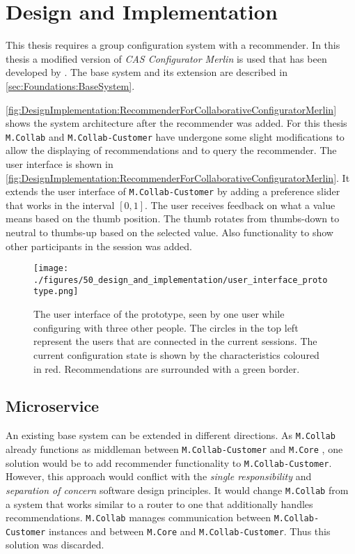 \chapter{Design and Implementation}
\label{ch:DesignImplementation}

This thesis requires a group configuration system with a recommender. In this thesis a modified version of \emph{CAS Configurator Merlin} \cite{IndustrySpecificProduct2020} is used that has been developed by \citeauthor{raabKollaborativeProduktkonfigurationEchtzeit2019} \cite{raabKollaborativeProduktkonfigurationEchtzeit2019}. The base system and its extension are described in \autoref{sec:Foundations:BaseSystem}.

\autoref{fig:DesignImplementation:RecommenderForCollaborativeConfiguratorMerlin} shows the system architecture after the recommender was added. For this thesis \texttt{M.Collab} and \texttt{M.Collab-Customer} have undergone some slight modifications to allow the displaying of recommendations and to query the recommender. The user interface is shown in \autoref{fig:DesignImplementation:RecommenderForCollaborativeConfiguratorMerlin}. It extends the user interface of \texttt{M.Collab-Customer} by adding a preference slider that works in the interval $[0,1]$. The user receives feedback on what a value means based on the thumb position. The thumb rotates from thumbs-down to neutral to thumbs-up based on the selected value. Also functionality to show other participants in the session was added.

\begin{figure}
    \centering
    \texttt{[image: ./figures/50\_design\_and\_implementation/user\_interface\_prototype.png]}
    \caption[User Interface]{The user interface of the prototype, seen by one user while configuring with three other people. The circles in the top left represent the users that are connected in the current sessions. The current configuration state is shown by the characteristics coloured in red. Recommendations are surrounded with a green border.}
    \label{fig:DesignImplementation:UserInterface}
\end{figure}


\section{Microservice}
\label{sec:DesignImplementation:Microservice}

An existing base system can be extended in different directions. As \texttt{M.Collab} already functions as middleman between \texttt{M.Collab-Customer} and \texttt{M.Core} , one solution would be to add recommender functionality to \texttt{M.Collab-Customer}. However, this approach would conflict with the \emph{single responsibility} \cite{martinCleanArchitectureCraftsman2017} and \emph{separation of concern} \cite{de2002importance} software design principles. It would change \texttt{M.Collab} from a system that works similar to a router to one that additionally handles  recommendations. \texttt{M.Collab} manages communication between \texttt{M.Collab-Customer} instances and between \texttt{M.Core} and \texttt{M.Collab-Customer}. Thus this solution was discarded.

